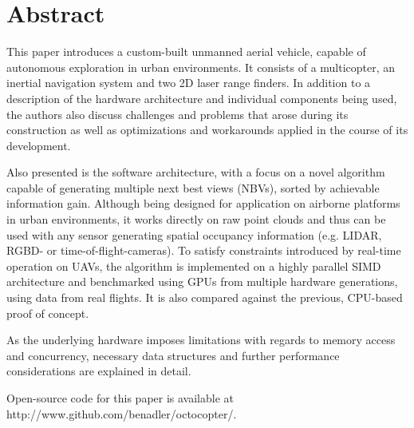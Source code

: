 \chapter*{Abstract}

This paper introduces a custom-built unmanned aerial vehicle, capable of autonomous exploration in urban environments. It consists of a multicopter, an inertial navigation system and two 2D laser range finders. In addition to a description of the hardware architecture and individual components being used, the authors also discuss challenges and problems that arose during its construction as well as optimizations and workarounds applied in the course of its development.

Also presented is the software architecture, with a focus on a novel algorithm capable of generating multiple next best views (NBVs), sorted by achievable information gain. Although being designed for application on airborne platforms in urban environments, it works directly on raw point clouds and thus can be used with any sensor generating spatial occupancy information (e.g. LIDAR, RGBD- or time-of-flight-cameras). To satisfy constraints introduced by real-time operation on UAVs, the algorithm is implemented on a highly parallel SIMD architecture and benchmarked using GPUs from multiple hardware generations, using data from real flights. It is also compared against the previous, CPU-based proof of concept.

As the underlying hardware imposes limitations with regards to memory access and concurrency, necessary data structures and further performance considerations are explained in detail.

Open-source code for this paper is available at http://www.github.com/benadler/octocopter/.
